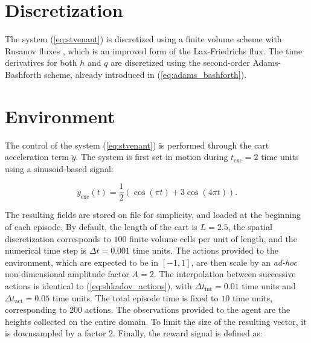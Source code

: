 



\section{Discretization}

The system (\ref{eq:stvenant}) is discretized using a finite volume scheme with Rusanov fluxes \cite{cordier2007}, which is an improved form of the Lax-Friedrichs flux. The time derivatives for both $h$ and $q$ are discretized using the second-order Adams-Bashforth scheme, already introduced in (\ref{eq:adams_bashforth}).

\section{Environment}

The control of the system (\ref{eq:stvenant}) is performed through the cart acceleration term $\ddot{y}$. The system is first set in motion during $t_\text{exc} = 2$ time units using a sinusoid-based signal:

\begin{equation}
	\ddot{y}_\text{exc} (t) = \frac{1}{2} \left( \cos ( \pi t ) + 3 \cos ( 4 \pi t) \right).
\end{equation}

The resulting fields are stored on file for simplicity, and loaded at the beginning of each episode. By default, the length of the cart is $L = 2.5$, the spatial discretization corresponds to $100$ finite volume cells per unit of length, and the numerical time step is $\Delta t = 0.001$ time units. The actions provided to the environment, which are expected to be in $\left[-1, 1\right]$, are then scale by an \textit{ad-hoc} non-dimensional amplitude factor $A=2$. The interpolation between successive actions is identical to (\ref{eq:shkadov_actions}), with $\Delta t_\text{int} = 0.01$ time units and $\Delta t_\text{act} = 0.05$ time units. The total episode time is fixed to $10$ time units, corresponding to $200$ actions. The observations provided to the agent are the heights collected on the entire domain. To limit the size of the resulting vector, it is downsampled by a factor 2. Finally, the reward signal is defined as:

